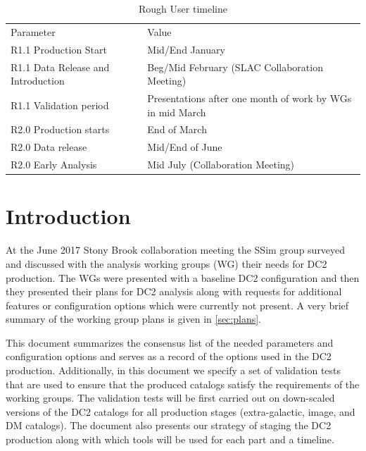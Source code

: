 \documentclass[preprint,times]{aastex61}
\begin{document}
\begin{table}[!htb]
  \centering
  \caption{Rough User timeline}
  \label{tab:User-Timeline}
  \begin{tabular}{| L{0.2\textwidth}| L{0.75\textwidth}| }
    \hline 
    Parameter                    & Value   \\
    R1.1 Production Start                & Mid/End January \\
    R1.1 Data Release and Introduction   & Beg/Mid February (SLAC Collaboration Meeting) \\
    R1.1 Validation period               & Presentations after one month of work by WGs in mid March \\
    R2.0 Production starts                & End of March \\
    R2.0 Data release                    & Mid/End of June \\
    R2.0 Early Analysis                  & Mid July (Collaboration Meeting) \\
   \hline
  \end{tabular}
\end{table}


\clearpage

\section{Introduction}

At the June 2017 Stony Brook collaboration meeting the SSim group
surveyed and discussed with the analysis working groups (WG) their
needs for DC2 production.  The WGs were presented with a baseline DC2
configuration and then they presented their plans for DC2 analysis
along with requests for additional features or configuration options
which were currently not present. A very brief summary of the working group plans is given in \autoref{sec:plans}.

This document summarizes the consensus list of the needed parameters
and configuration options and serves as a record of the options used
in the DC2 production.  Additionally, in this document we specify a set of validation 
tests that are used to ensure that the produced catalogs satisfy the requirements of the working groups. The validation tests will be first carried out on down-scaled versions of the DC2 catalogs for all production stages (extra-galactic, image, and DM catalogs).
The document also presents our strategy of staging the DC2
production along with which tools will be used for each part and a timeline.
 
\end{document}
